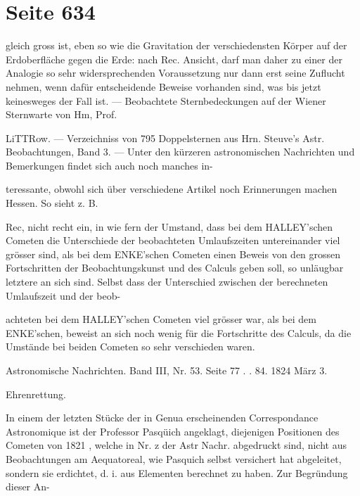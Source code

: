\documentclass[10pt,a4paper]{article}
\begin{document}
\newpage
\section*{Seite 634}
gleich gross ist, eben so wie die Gravitation der verschiedensten Körper auf der Erdoberfläche gegen die Erde: nach Rec. Ansicht, darf man daher zu einer der Analogie so sehr widersprechenden Voraussetzung nur dann erst seine Zuflucht nehmen, wenn dafür entscheidende Beweise vorhanden sind, was bis jetzt keinesweges der Fall ist. — Beobachtete Sternbedeckungen auf der Wiener Sternwarte von Hm, Prof.

LiTTRow. — Verzeichniss von 795 Doppelsternen aus Hrn. Steuve's Astr. Beobachtungen, Band 3. — Unter den kürzeren astronomischen Nachrichten und Bemerkungen findet sich auch noch manches in-

teressante, obwohl sich über verschiedene Artikel noch Erinnerungen machen Hessen. So sieht z. B.

Rec, nicht recht ein, in wie fern der Umstand, dass bei dem HALLEY'schen Cometen die Unterschiede der beobachteten Umlaufszeiten untereinander viel grösser sind, als bei dem ENKE'schen Cometen einen Beweis von den grossen Fortschritten der Beobachtungskunst und des Calculs geben soll, so unläugbar letztere an sich sind. Selbst dass der Unterschied zwischen der berechneten Umlaufszeit und der beob-

achteten bei dem HALLEY'schen Cometen viel grösser war, als bei dem ENKE'schen, beweist an sich noch wenig für die Fortschritte des Calculs, da die Umstände bei beiden Cometen so sehr verschieden waren.

Astronomische Nachrichten. Band III, Nr. 53. Seite 77 . . 84. 1824 März 3.

Ehrenrettung.

In einem der letzten Stücke der in Genua erscheinenden Correspondance Astronomique ist der Professor Pasqüich angeklagt, diejenigen Positionen des Cometen von 1821 , welche in Nr. z der Astr Nachr. abgedruckt sind, nicht aus Beobachtungen am Aequatoreal, wie Pasquich selbst versichert hat abgeleitet, sondern sie erdichtet, d. i. aus Elementen berechnet zu haben. Zur Begründung dieser An-
\end{document}
